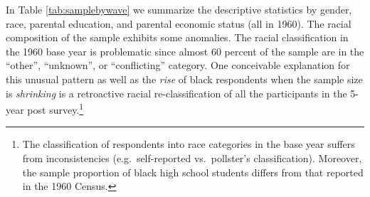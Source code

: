 \documentclass[onehalfspacing,11pt]{article}
\begin{document}
	In Table \ref{tab:samplebywave} we summarize the descriptive statistics by gender, race, parental education, and parental economic status (all in 1960). The racial composition of the sample exhibits some anomalies. The racial classification in the 1960 base year is problematic since almost 60 percent of the sample are in the ``other'', ``unknown'', or ``conflicting'' category. One conceivable explanation for this unusual pattern as well as the {\it rise} of black respondents when the sample size is {\it shrinking} is a retroactive racial re-classification of all the participants in the 5-year post survey.\footnote{The classification of respondents into race categories in the base year suffers from inconsistencies (e.g.~self-reported vs.~pollster's classification). Moreover, the sample proportion of black high school students differs from that reported in the 1960 Census.}
	
\end{document}
